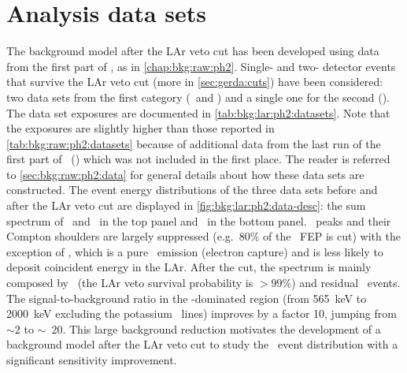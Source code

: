 \section{Analysis data sets}%
\label{sec:bkg:lar:ph2:data}

\begin{table}
  \centering
  \caption{%
    Properties of the data sets considered in this analysis. Further details about the
    \gerda\ detectors can be found in past publications~\cite{Agostini2013a,
    Agostini2018a}. Note that the exposures are slightly higher than those reported in
    \cref{tab:bkg:raw:ph2:datasets} because of additional data from the last run of the
    first part of \phasetwo\ () which was not included in the first place.
  }\label{tab:bkg:lar:ph2:datasets}
  \small
  
\end{table}%

The background model after the LAr veto cut has been developed using data from the first
part of \gerdatwo, as in \cref{chap:bkg:raw:ph2}. Single- and two- detector events that
survive the LAr veto cut (more in \cref{sec:gerda:cuts}) have been considered: two data
sets from the first category (\enrBEGeII\ and \enrCoaxII) and a single one for the second
(\enrGeII). The data set exposures are documented in \cref{tab:bkg:lar:ph2:datasets}.
Note that the exposures are slightly higher than those reported in
\cref{tab:bkg:raw:ph2:datasets} because of additional data from the last run of the first
part of \phasetwo\ () which was not included in the first place.  The reader is
referred to \cref{sec:bkg:raw:ph2:data} for general details about how these data sets are
constructed.
\newpar
The event energy distributions of the three data sets before and after the LAr veto cut
are displayed in \cref{fig:bkg:lar:ph2:data-desc}: the sum spectrum of \enrBEGeII\ and
\enrCoaxII\ in the top panel and \enrGeII\ in the bottom panel. \g\ peaks and their
Compton shoulders are largely suppressed (e.g.~80\% of the \kvz\ FEP is cut) with the
exception of \kvn, which is a pure \g\ emission (electron capture) and is less likely to
deposit coincident energy in the LAr. After the cut, the spectrum is mainly composed by
\nnbb\ (the LAr veto survival probability is $>99$\%) and residual \a\ events. The
signal-to-background ratio in the \nnbb-dominated region (from 565~keV to 2000~keV
excluding the potassium \g\ lines) improves by a factor 10, jumping from $\sim$2 to
$\sim$~20. This large background reduction motivates the development of a background model
after the LAr veto cut to study the \nnbb\ event distribution with a significant
sensitivity improvement.

